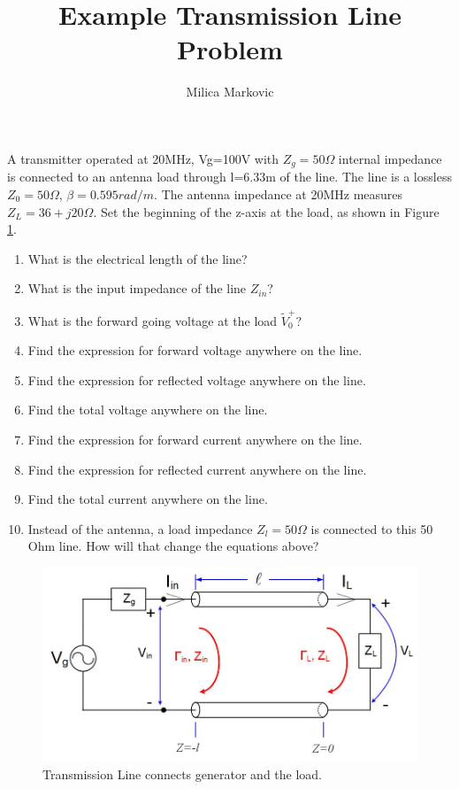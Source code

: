 \documentclass{ximera}
\title{Example Transmission Line Problem}
\author{Milica Markovic}
\begin{document}
  
\begin{abstract}  

\end{abstract}  
\maketitle    


\begin{example}

A transmitter operated at 20MHz, Vg=100V with $Z_g=50 \Omega$ internal impedance is connected to an antenna load through l=6.33m of the line. The line is a lossless $Z_0=50 \Omega$, $\beta=0.595rad/m$. The antenna impedance at 20MHz measures $Z_L=36+j20 \Omega$. Set the beginning of the z-axis at the load, as shown in Figure \ref{fig:TRLine}.
\begin{enumerate}
\item What is the electrical length of the line? 
\item What is the input impedance of the line $Z_{in}$?
\item What is the forward going voltage at the load $\tilde{V}_0^+$?
\item Find the expression for forward voltage anywhere on the line.
\item Find the expression for reflected voltage anywhere on the line.
\item Find the total voltage anywhere on the line.
\item Find the expression for forward current anywhere on the line.
\item Find the expression for reflected current anywhere on the line.
\item Find the total current anywhere on the line.
\item Instead of the antenna, a load impedance $Z_l=50 \Omega$ is connected to this 50 Ohm line. How will that change the equations above?
\end{enumerate}




\begin{figure}[htbp]
\begin{center}
\includegraphics[scale=0.3]{../jpg/trline.jpg}
\end{center}
\caption{Transmission Line connects generator and the load.}
\label{fig:TRLine}
\end{figure}



\end{example}
\end{document}
